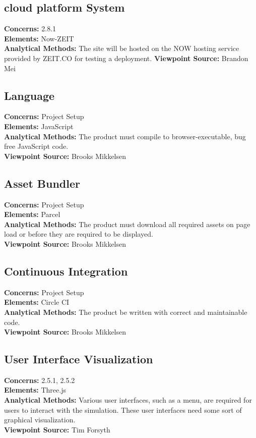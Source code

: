 \documentclass[onecolumn, draftclsnofoot,10pt, compsoc]{IEEEtran}
\begin{document}
\subsection{cloud platform System}
\textbf{Concerns:} 2.8.1\\
\textbf{Elements:} Now-ZEIT\\
\textbf{Analytical Methods:} The site will be hosted on the NOW hosting service provided by ZEIT.CO for testing a deployment.
\textbf{Viewpoint Source:} Brandon Mei

\subsection{Language}
\textbf{Concerns:} Project Setup\\
\textbf{Elements:} JavaScript\\
\textbf{Analytical Methods:} The product must compile to browser-executable, bug free JavaScript code.\\ 
\textbf{Viewpoint Source:} Brooks Mikkelsen

\subsection{Asset Bundler}
\textbf{Concerns:} Project Setup\\
\textbf{Elements:} Parcel\\ 
\textbf{Analytical Methods:} The product must download all required assets on page load or before they are required to be displayed.\\
\textbf{Viewpoint Source:} Brooks Mikkelsen

\subsection{Continuous Integration}
\textbf{Concerns:} Project Setup\\
\textbf{Elements:} Circle CI\\
\textbf{Analytical Methods:} The product be written with correct and maintainable code.\\
\textbf{Viewpoint Source:} Brooks Mikkelsen

\subsection{User Interface Visualization}
\textbf{Concerns:} 2.5.1, 2.5.2\\
\textbf{Elements:} Three.js\\
\textbf{Analytical Methods:} Various user interfaces, such as a menu, are required for users to interact with the simulation. These user interfaces need some sort of graphical visualization.\\
\textbf{Viewpoint Source:} Tim Forsyth
\end{document}
